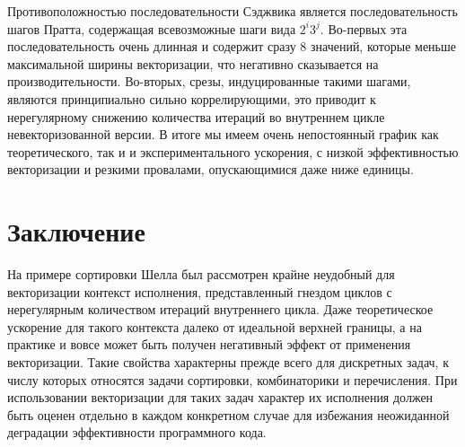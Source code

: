\documentclass[utf8]{psta}
\begin{document}
Противоположностью последовательности Сэджвика является последовательность шагов Пратта, содержащая всевозможные шаги вида $2^i3^j$.
Во-первых эта последовательность очень длинная и содержит сразу 8 значений, которые меньше максимальной ширины векторизации, что негативно сказывается на производительности.
Во-вторых, срезы, индуцированные такими шагами, являются принципиально сильно коррелирующими, это приводит к нерегулярному снижению количества итераций во внутреннем цикле невекторизованной версии.
В итоге мы имеем очень непостоянный график как теоретического, так и и экспериментального ускорения, с низкой эффективностью векторизации и резкими провалами, опускающимися даже ниже единицы.

\section*{Заключение}

На примере сортировки Шелла был рассмотрен крайне неудобный для векторизации контекст исполнения, представленный гнездом циклов с нерегулярным количеством итераций внутреннего цикла.
Даже теоретическое ускорение для такого контекста далеко от идеальной верхней границы, а на практике и вовсе может быть получен негативный эффект от применения векторизации.
Такие свойства характерны прежде всего для дискретных задач, к числу которых относятся задачи сортировки, комбинаторики и перечисления.
При использовании векторизации для таких задач характер их исполнения должен быть оценен отдельно в каждом конкретном случае для избежания неожиданной деградации эффективности программного кода.
\end{document}
